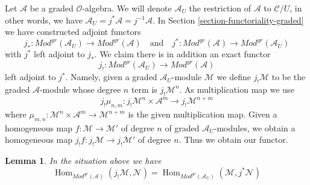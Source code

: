 \documentclass{stacks-project}
\theoremstyle{plain}
\newtheorem{lemma}[subsection]{Lemma}
\theoremstyle{definition}
\theoremstyle{remark}
\numberwithin{equation}{subsection}
\def\Hom{\mathop{\mathrm{Hom}}\nolimits}
\begin{document}
\medskip\noindent
Let $\mathcal{A}$ be a graded $\mathcal{O}$-algebra.
We will denote $\mathcal{A}_U$ the restriction of $\mathcal{A}$
to $\mathcal{C}/U$, in other words, we have
$\mathcal{A}_U = j^*\mathcal{A} = j^{-1}\mathcal{A}$.
In Section \ref{section-functoriality-graded}
we have constructed adjoint functors
$$
j_* :
\textit{Mod}^{gr}(\mathcal{A}_U)
\longrightarrow
\textit{Mod}^{gr}(\mathcal{A})
\quad\text{and}\quad
j^* :
\textit{Mod}^{gr}(\mathcal{A})
\longrightarrow
\textit{Mod}^{gr}(\mathcal{A}_U)
$$
with $j^*$ left adjoint to $j_*$. We claim there is in addition an
exact functor
$$
j_! :
\textit{Mod}^{gr}(\mathcal{A}_U)
\longrightarrow
\textit{Mod}^{gr}(\mathcal{A})
$$
left adjoint to $j^*$. Namely, given a graded $\mathcal{A}_U$-module
$\mathcal{M}$ we define $j_!\mathcal{M}$ to be the graded $\mathcal{A}$-module
whose degree $n$ term is $j_!\mathcal{M}^n$. As multiplication map
we use
$$
j_!\mu_{n, m} :
j_!\mathcal{M}^n \times \mathcal{A}^m \to
j_!\mathcal{M}^{n + m}
$$
where $\mu_{m, n} : \mathcal{M}^n \times \mathcal{A}^m \to \mathcal{M}^{n + m}$
is the given multiplication map. Given a homogeneous map
$f : \mathcal{M} \to \mathcal{M}'$ of degree $n$ of graded
$\mathcal{A}_U$-modules, we obtain a homogeneous map
$j_!f : j_!\mathcal{M} \to j_!\mathcal{M}'$ of degree $n$.
Thus we obtain our functor.

\begin{lemma}
\label{lemma-extension-by-zero-graded}
In the situation above we have
$$
\Hom_{\textit{Mod}^{gr}(\mathcal{A})}(
j_!\mathcal{M}, \mathcal{N}) =
\Hom_{\textit{Mod}^{gr}(\mathcal{A}_U)}(
\mathcal{M}, j^*\mathcal{N})
$$
\end{lemma}
\end{document}
